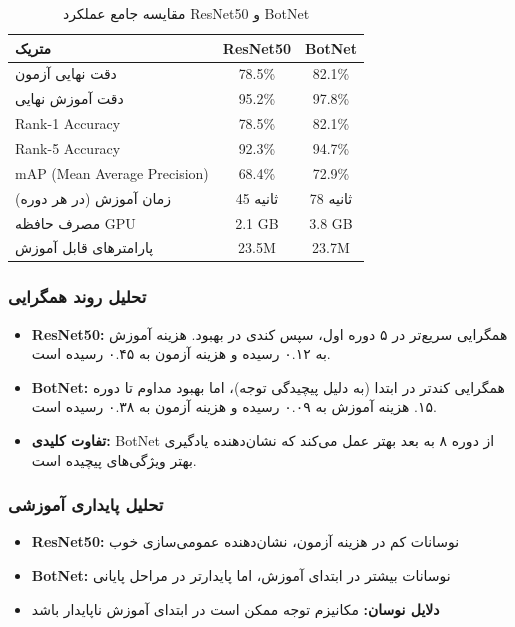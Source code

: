 \documentclass[12pt,a4paper]{article}
\theoremstyle{definition}
\begin{document}
\begin{table}[H]
    \centering
    \begin{tabular}{lcc}
        \toprule
        \textbf{متریک} & \textbf{ResNet50} & \textbf{BotNet} \\
        \midrule
        دقت نهایی آزمون & 78.5\% & 82.1\% \\
        دقت آموزش نهایی & 95.2\% & 97.8\% \\
        Rank-1 Accuracy & 78.5\% & 82.1\% \\
        Rank-5 Accuracy & 92.3\% & 94.7\% \\
        mAP (Mean Average Precision) & 68.4\% & 72.9\% \\
        \midrule
        زمان آموزش (در هر دوره) & 45 ثانیه & 78 ثانیه \\
        مصرف حافظه GPU & 2.1 GB & 3.8 GB \\
        پارامترهای قابل آموزش & 23.5M & 23.7M \\
        \bottomrule
    \end{tabular}
    \caption{مقایسه جامع عملکرد ResNet50 و BotNet}
\end{table}

\subsubsection*{تحلیل روند همگرایی}
\begin{itemize}
    \item \textbf{ResNet50:} همگرایی سریع‌تر در ۵ دوره اول، سپس کندی در بهبود. هزینه آموزش به ۰.۱۲ رسیده و هزینه آزمون به ۰.۴۵ رسیده است.
    \item \textbf{BotNet:} همگرایی کندتر در ابتدا (به دلیل پیچیدگی توجه)، اما بهبود مداوم تا دوره ۱۵. هزینه آموزش به ۰.۰۹ رسیده و هزینه آزمون به ۰.۳۸ رسیده است.
    \item \textbf{تفاوت کلیدی:} BotNet از دوره ۸ به بعد بهتر عمل می‌کند که نشان‌دهنده یادگیری بهتر ویژگی‌های پیچیده است.
\end{itemize}

\subsubsection*{تحلیل پایداری آموزشی}
\begin{itemize}
    \item \textbf{ResNet50:} نوسانات کم در هزینه آزمون، نشان‌دهنده عمومی‌سازی خوب
    \item \textbf{BotNet:} نوسانات بیشتر در ابتدای آموزش، اما پایدارتر در مراحل پایانی
    \item \textbf{دلایل نوسان:} مکانیزم توجه ممکن است در ابتدای آموزش ناپایدار باشد
\end{itemize}
\end{document}
